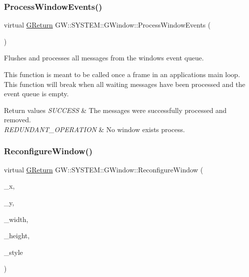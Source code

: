 \subsubsection{\texorpdfstring{Process\+Window\+Events()}{ProcessWindowEvents()}}
{\footnotesize\ttfamily virtual \mbox{\hyperlink{namespace_g_w_a67a839e3df7ea8a5c5686613a7a3de21}{G\+Return}} G\+W\+::\+S\+Y\+S\+T\+E\+M\+::\+G\+Window\+::\+Process\+Window\+Events (\begin{DoxyParamCaption}{ }\end{DoxyParamCaption})\hspace{0.3cm}{\ttfamily [pure virtual]}}



Flushes and processes all messages from the window\textquotesingle{}s event queue. 

This function is meant to be called once a frame in an application\textquotesingle{}s main loop. This function will break when all waiting messages have been processed and the event queue is empty.


\begin{DoxyRetVals}{Return values}
{\em S\+U\+C\+C\+E\+SS} & The messages were successfully processed and removed. \\
\hline
{\em R\+E\+D\+U\+N\+D\+A\+N\+T\+\_\+\+O\+P\+E\+R\+A\+T\+I\+ON} & No window exists process. \\
\hline
\end{DoxyRetVals}
\mbox{\label{class_g_w_1_1_s_y_s_t_e_m_1_1_g_window_a113350a164370d30932a0476f00e4ea9}} 
\subsubsection{\texorpdfstring{Reconfigure\+Window()}{ReconfigureWindow()}}
{\footnotesize\ttfamily virtual \mbox{\hyperlink{namespace_g_w_a67a839e3df7ea8a5c5686613a7a3de21}{G\+Return}} G\+W\+::\+S\+Y\+S\+T\+E\+M\+::\+G\+Window\+::\+Reconfigure\+Window (\begin{DoxyParamCaption}\item[{int}]{\+\_\+x,  }\item[{int}]{\+\_\+y,  }\item[{int}]{\+\_\+width,  }\item[{int}]{\+\_\+height,  }\item[{\mbox{\hyperlink{namespace_g_w_1_1_s_y_s_t_e_m_ad117891e556631f842625c348d36a071}{G\+Window\+Style}}}]{\+\_\+style }\end{DoxyParamCaption})\hspace{0.3cm}{\ttfamily [pure virtual]}}



